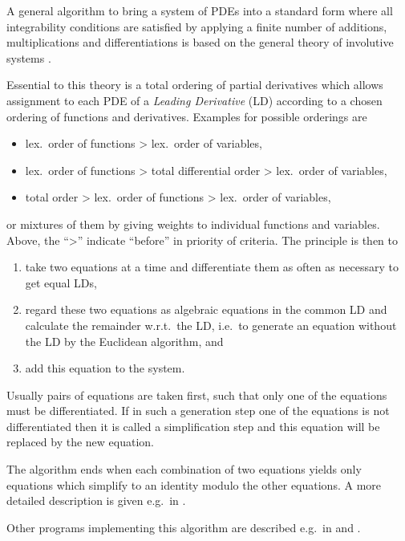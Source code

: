 A general algorithm to bring a system of PDEs into a standard form
where all integrability conditions are satisfied by applying a finite
number of additions, multiplications and differentiations is based on
the general theory of involutive systems \cite{Riquier:1910,
  Thomas:1937, Janet:1929}.

Essential to this theory is a total ordering of partial derivatives
which allows assignment to each PDE of a \emph{Leading Derivative}
(LD) according to a chosen ordering of functions and derivatives.
Examples for possible orderings are
\begin{itemize}
\item lex.\ order of functions \textgreater{} lex.\ order of variables,
\item lex.\ order of functions \textgreater{} total differential order
  \textgreater{} lex.\ order of variables,
\item total order \textgreater{} lex.\ order of functions
  \textgreater{} lex.\ order of variables,
\end{itemize}
or mixtures of them by giving weights to individual functions and
variables.  Above, the ``\textgreater'' indicate ``before'' in
priority of criteria.  The principle is then to
\begin{enumerate}
\item take two equations at a time and differentiate them as
  often as necessary to get equal LDs,
\item regard these two equations as algebraic equations in the
  common LD and calculate the remainder w.r.t.\ the LD, i.e.\ to
  generate an equation without the LD by the Euclidean algorithm, and
\item add this equation to the system.
\end{enumerate}
Usually pairs of equations are taken first, such that only one of the
equations must be differentiated.  If in such a generation step one of
the equations is not differentiated then it is called a simplification
step and this equation will be replaced by the new equation.

The algorithm ends when each combination of two equations yields only
equations which simplify to an identity modulo the other equations.  A
more detailed description is given e.g.\ in \cite{Bocharov:89,
  Reid:90}.

Other programs implementing this algorithm are described e.g.\ in
\cite{Schwarz:1985, Bocharov:89, Fushchich:89, Reid:90,
  Reid_Wittkopf_Boulton:1996, Reid_Lin_Wittkopf:2001} and
\cite{Mansfield:1996}.

